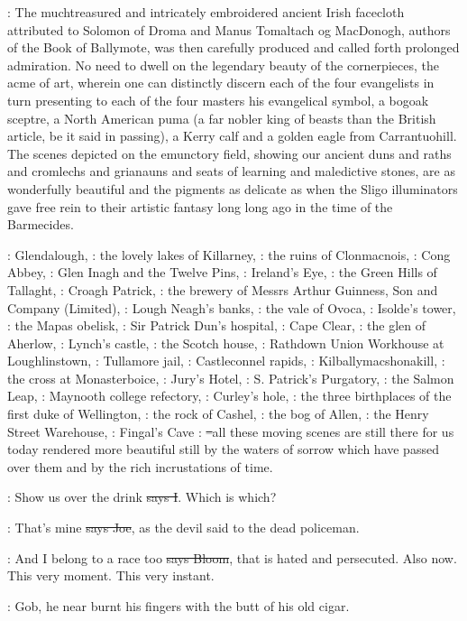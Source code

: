 :
The muchtreasured and intricately embroidered ancient Irish
facecloth attributed to Solomon of Droma and Manus Tomaltach og
MacDonogh, authors of the Book of Ballymote, was then carefully
produced and called forth prolonged admiration. No need to dwell on the
legendary beauty of the cornerpieces, the acme of art, wherein one can
distinctly discern each of the four evangelists in turn presenting to each
of the four masters his evangelical symbol, a bogoak sceptre, a North
American puma (a far nobler king of beasts than the British article, be it
said in passing), a Kerry calf and a golden eagle from Carrantuohill. The
scenes depicted on the emunctory field, showing our ancient duns and raths
and cromlechs and grianauns and seats of learning and maledictive stones,
are as wonderfully beautiful and the pigments as delicate as when the
Sligo illuminators gave free rein to their artistic fantasy long long ago
in the time of the Barmecides.

:
Glendalough,
:
the lovely lakes of Killarney,
:
the ruins of Clonmacnois,
:
Cong Abbey,
:
Glen Inagh and the Twelve Pins,
:
Ireland's Eye,
:
the Green Hills of Tallaght,
:
Croagh Patrick,
:
the brewery of Messrs Arthur Guinness, Son and Company (Limited),
:
Lough Neagh's banks,
:
the vale of Ovoca,
:
Isolde's tower,
:
the Mapas obelisk, 
:
Sir Patrick Dun's hospital, 
:
Cape Clear, 
:
the glen of Aherlow, 
:
Lynch's castle, 
:
the Scotch house, 
:
Rathdown Union Workhouse at Loughlinstown, 
:
Tullamore jail, 
:
Castleconnel rapids, 
:
Kilballymacshonakill, 
:
the cross at Monasterboice, 
:
Jury's Hotel, 
:
S. Patrick's Purgatory, 
:
the Salmon Leap, 
:
Maynooth college refectory, 
:
Curley's hole, 
:
the three birthplaces of the first duke of Wellington, 
:
the rock of Cashel, 
:
the bog of Allen, 
:
the Henry Street Warehouse, 
:
Fingal's Cave
:
\sout{--}all these moving scenes are still there for us
today rendered more beautiful still by the waters of sorrow which have
passed over them and by the rich incrustations of time.

:
Show us over the drink \sout{says I}.
Which is which?

\joe:
That's mine \sout{says Joe},
as the devil said to the dead policeman.

\Bloom:
And I belong to a race too \sout{says Bloom},
that is hated and persecuted.
Also now. This very moment. This very instant.

\Nq:
Gob, he near burnt his fingers with the butt of his old cigar.

